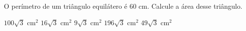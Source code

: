 \noindent\parbox{\linewidth}{

O perímetro de um triângulo equilátero é $60$ cm. Calcule a área desse triângulo.

$100\sqrt{3}$ cm$^2$
$16\sqrt{3}$ cm$^2$
$9\sqrt{3}$ cm$^2$
$196\sqrt{3}$ cm$^2$
$49\sqrt{3}$ cm$^2$



}


